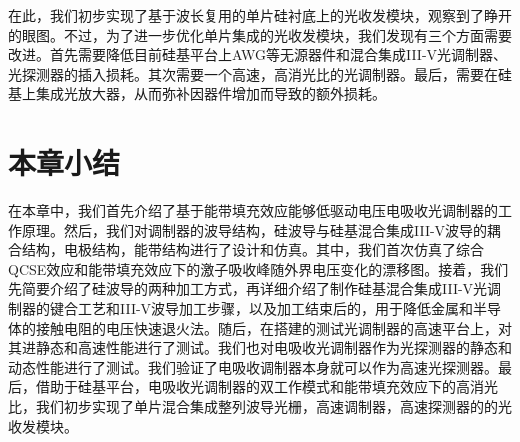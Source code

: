 在此，我们初步实现了基于波长复用的单片硅衬底上的光收发模块，观察到了睁开的眼图。不过，为了进一步优化单片集成的光收发模块，我们发现有三个方面需要改进。首先需要降低目前硅基平台上AWG等无源器件和混合集成III-V光调制器、光探测器的插入损耗。其次需要一个高速，高消光比的光调制器。最后，需要在硅基上集成光放大器，从而弥补因器件增加而导致的额外损耗。

\section{本章小结}
在本章中，我们首先介绍了基于能带填充效应能够低驱动电压电吸收光调制器的工作原理。然后，我们对调制器的波导结构，硅波导与硅基混合集成III-V波导的耦合结构，电极结构，能带结构进行了设计和仿真。其中，我们首次仿真了综合QCSE效应和能带填充效应下的激子吸收峰随外界电压变化的漂移图。接着，我们先简要介绍了硅波导的两种加工方式，再详细介绍了制作硅基混合集成III-V光调制器的键合工艺和III-V波导加工步骤，以及加工结束后的，用于降低金属和半导体的接触电阻的电压快速退火法。随后，在搭建的测试光调制器的高速平台上，对其进静态和高速性能进行了测试。我们也对电吸收光调制器作为光探测器的静态和动态性能进行了测试。我们验证了电吸收调制器本身就可以作为高速光探测器。最后，借助于硅基平台，电吸收光调制器的双工作模式和能带填充效应下的高消光比，我们初步实现了单片混合集成整列波导光栅，高速调制器，高速探测器的的光收发模块。
